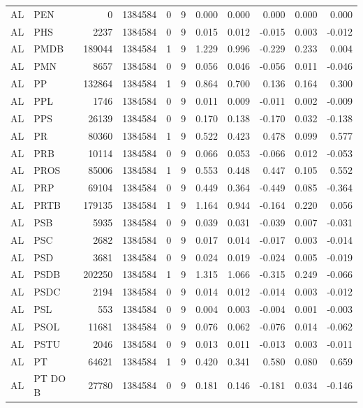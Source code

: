 \begin{landscape}
\begin{longtable}{llrrrrrrrrr}
AL & PEN & 0 & 1384584 & 0 & 9 & 0.000 & 0.000 & 0.000 & 0.000 & 0.000 \\
AL & PHS & 2237 & 1384584 & 0 & 9 & 0.015 & 0.012 & -0.015 & 0.003 & -0.012 \\
AL & PMDB & 189044 & 1384584 & 1 & 9 & 1.229 & 0.996 & -0.229 & 0.233 & 0.004 \\
AL & PMN & 8657 & 1384584 & 0 & 9 & 0.056 & 0.046 & -0.056 & 0.011 & -0.046 \\
AL & PP & 132864 & 1384584 & 1 & 9 & 0.864 & 0.700 & 0.136 & 0.164 & 0.300 \\
AL & PPL & 1746 & 1384584 & 0 & 9 & 0.011 & 0.009 & -0.011 & 0.002 & -0.009 \\
AL & PPS & 26139 & 1384584 & 0 & 9 & 0.170 & 0.138 & -0.170 & 0.032 & -0.138 \\
AL & PR & 80360 & 1384584 & 1 & 9 & 0.522 & 0.423 & 0.478 & 0.099 & 0.577 \\
AL & PRB & 10114 & 1384584 & 0 & 9 & 0.066 & 0.053 & -0.066 & 0.012 & -0.053 \\
AL & PROS & 85006 & 1384584 & 1 & 9 & 0.553 & 0.448 & 0.447 & 0.105 & 0.552 \\
AL & PRP & 69104 & 1384584 & 0 & 9 & 0.449 & 0.364 & -0.449 & 0.085 & -0.364 \\
AL & PRTB & 179135 & 1384584 & 1 & 9 & 1.164 & 0.944 & -0.164 & 0.220 & 0.056 \\
AL & PSB & 5935 & 1384584 & 0 & 9 & 0.039 & 0.031 & -0.039 & 0.007 & -0.031 \\
AL & PSC & 2682 & 1384584 & 0 & 9 & 0.017 & 0.014 & -0.017 & 0.003 & -0.014 \\
AL & PSD & 3681 & 1384584 & 0 & 9 & 0.024 & 0.019 & -0.024 & 0.005 & -0.019 \\
AL & PSDB & 202250 & 1384584 & 1 & 9 & 1.315 & 1.066 & -0.315 & 0.249 & -0.066 \\
AL & PSDC & 2194 & 1384584 & 0 & 9 & 0.014 & 0.012 & -0.014 & 0.003 & -0.012 \\
AL & PSL & 553 & 1384584 & 0 & 9 & 0.004 & 0.003 & -0.004 & 0.001 & -0.003 \\
AL & PSOL & 11681 & 1384584 & 0 & 9 & 0.076 & 0.062 & -0.076 & 0.014 & -0.062 \\
AL & PSTU & 2046 & 1384584 & 0 & 9 & 0.013 & 0.011 & -0.013 & 0.003 & -0.011 \\
AL & PT & 64621 & 1384584 & 1 & 9 & 0.420 & 0.341 & 0.580 & 0.080 & 0.659 \\
AL & PT DO B & 27780 & 1384584 & 0 & 9 & 0.181 & 0.146 & -0.181 & 0.034 & -0.146 \\

\end{longtable}
\end{landscape}
